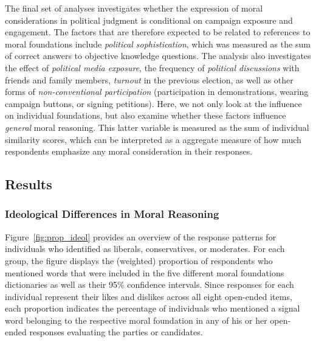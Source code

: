 \documentclass[12pt]{article}
\begin{document}
The final set of analyses investigates whether the expression of moral considerations in political judgment is conditional on campaign exposure and engagement. The factors that are therefore expected to be related to references to moral foundations include \textit{political sophistication}, which was measured as the sum of correct answers to objective knowledge questions. The analysis also investigates the effect of \textit{political media exposure}, the frequency of \textit{political discussions} with friends and family members, \textit{turnout} in the previous election, as well as other forms of \textit{non-conventional participation} (participation in demonstrations, wearing campaign buttons, or signing petitions). Here, we not only look at the influence on individual foundations, but also examine whether these factors influence \textit{general} moral reasoning. This latter variable is measured as the sum of individual similarity scores, which can be interpreted as a aggregate measure of how much respondents emphasize any moral consideration in their responses.



\subsection{Results}

\subsubsection{Ideological Differences in Moral Reasoning}

Figure~\ref{fig:prop_ideol} provides an overview of the response patterns for individuals who identified as liberals, conservatives, or moderates. For each group, the figure displays the (weighted) proportion of respondents who mentioned words that were included in the five different moral foundations dictionaries as well as their 95\% confidence intervals. Since responses for each individual represent their likes and dislikes across all eight open-ended items, each proportion indicates the percentage of individuals who mentioned a signal word belonging to the respective moral foundation in any of his or her open-ended responses evaluating the parties or candidates.
\end{document}
